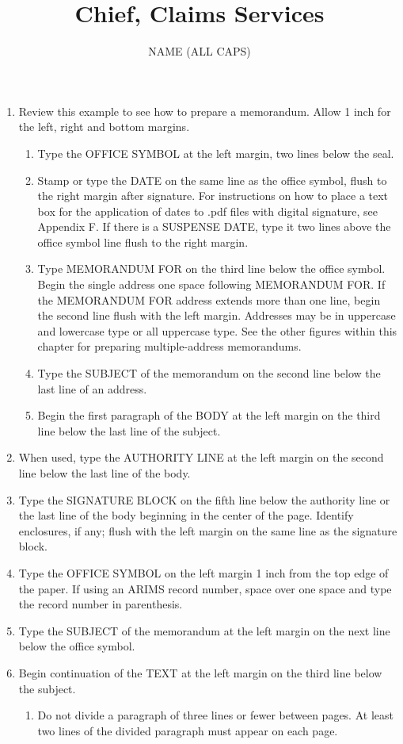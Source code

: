 \documentclass{/app/resources/latex/armymemo-notikz}
\author{NAME (ALL CAPS)}\rank{Major}\branch{JA}
\title{Chief, Claims Services}
\begin{document}
\begin{enumerate}
\item Review this example to see how to prepare a memorandum. Allow 1 inch for the left, right and bottom margins.
\begin{enumerate}
\item Type the OFFICE SYMBOL at the left margin, two lines below the seal.
\item Stamp or type the DATE on the same line as the office symbol, flush to the right margin after signature. For instructions on how to place a text box for the application of dates to .pdf files with digital signature, see Appendix F. If there is a SUSPENSE DATE, type it two lines above the office symbol line flush to the right margin.
\item Type MEMORANDUM FOR on the third line below the office symbol. Begin the single address one space following MEMORANDUM FOR. If the MEMORANDUM FOR address extends more than one line, begin the second line flush with the left margin. Addresses may be in uppercase and lowercase type or all uppercase type. See the other figures within this chapter for preparing multiple-address memorandums.
\item Type the SUBJECT of the memorandum on the second line below the last line of an address.
\item Begin the first paragraph of the BODY at the left margin on the third line below the last line of the subject.
\end{enumerate}
\item When used, type the AUTHORITY LINE at the left margin on the second line below the last line of the body.
\item Type the SIGNATURE BLOCK on the fifth line below the authority line or the last line of the body beginning in the center of the page. Identify enclosures, if any; flush with the left margin on the same line as the signature block.
\item Type the OFFICE SYMBOL on the left margin 1 inch from the top edge of the paper. If using an ARIMS record number, space over one space and type the record number in parenthesis.
\item Type the SUBJECT of the memorandum at the left margin on the next line below the office symbol.
\item Begin continuation of the TEXT at the left margin on the third line below the subject.
\begin{enumerate}
\item Do not divide a paragraph of three lines or fewer between pages. At least two lines of the divided paragraph must appear on each page.

\end{enumerate}
\end{enumerate}
\end{document}
